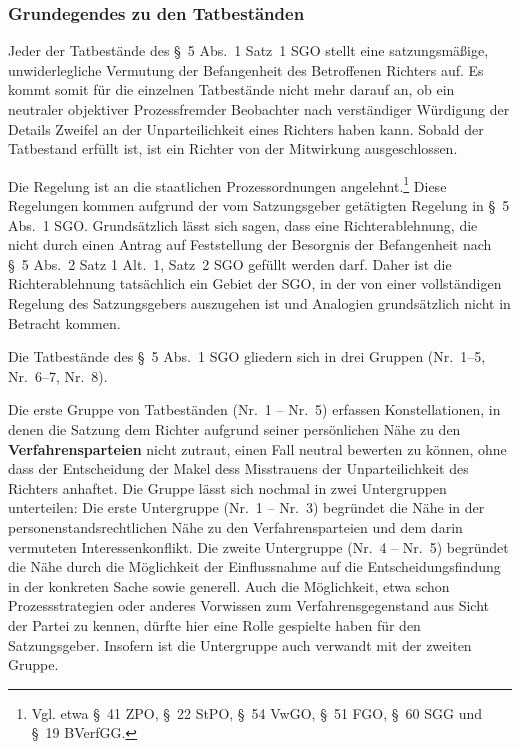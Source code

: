 \subsubsection{Grundegendes zu den Tatbeständen}
\label{Zusammensetzung:Spruchkoerper:Befangenheitsvermutung:Tatbestandsgrundsaetze}
Jeder der Tatbestände des \S~5 Abs.~1 Satz~1 SGO stellt eine satzungsmäßige, unwiderlegliche Vermutung der Befangenheit des Betroffenen Richters auf.
Es kommt somit für die einzelnen Tatbestände nicht mehr darauf an, ob ein neutraler objektiver Prozessfremder Beobachter nach verständiger Würdigung der Details Zweifel an der Unparteilichkeit eines Richters haben kann.
Sobald der Tatbestand erfüllt ist, ist ein Richter von der Mitwirkung ausgeschlossen.

Die Regelung ist an die staatlichen Prozessordnungen angelehnt.\footnote{Vgl. etwa \S~41 ZPO,  \S~22 StPO, \S~54 VwGO, \S~51 FGO, \S~60 SGG und \S~19 BVerfGG.}
Diese Regelungen kommen aufgrund der vom Satzungsgeber getätigten Regelung in \S~5 Abs.~1 SGO.
Grundsätzlich lässt sich sagen, dass eine Richterablehnung, die nicht durch einen Antrag auf Feststellung der Besorgnis der Befangenheit nach \S~5 Abs.~2 Satz 1 Alt.~1, Satz~2 SGO gefüllt werden darf.
Daher ist die Richterablehnung tatsächlich ein Gebiet der SGO, in der von einer vollständigen Regelung des Satzungsgebers auszugehen ist und Analogien grundsätzlich nicht in Betracht kommen.

Die Tatbestände des \S~5 Abs.~1 SGO gliedern sich in drei Gruppen (Nr.~1--5, Nr.~6--7, Nr.~8).

Die erste Gruppe von Tatbeständen (Nr.~1 -- Nr.~5) erfassen Konstellationen, in denen die Satzung dem Richter aufgrund seiner persönlichen Nähe zu den \textbf{Verfahrensparteien} nicht zutraut, einen Fall neutral bewerten zu können, ohne dass der Entscheidung der Makel dess Misstrauens der Unparteilichkeit des Richters anhaftet.
Die Gruppe lässt sich nochmal in zwei Untergruppen unterteilen:
Die erste Untergruppe (Nr.~1 -- Nr.~3) begründet die Nähe in der personenstandsrechtlichen Nähe zu den Verfahrensparteien und dem darin vermuteten Interessenkonflikt.
Die zweite Untergruppe (Nr.~4 -- Nr.~5) begründet die Nähe durch die Möglichkeit der Einflussnahme auf die Entscheidungsfindung in der konkreten Sache sowie generell. Auch die Möglichkeit, etwa schon Prozessstrategien oder anderes Vorwissen zum Verfahrensgegenstand aus Sicht der Partei zu kennen, dürfte hier eine Rolle gespielte haben für den Satzungsgeber. Insofern ist die Untergruppe auch verwandt mit der zweiten Gruppe.

